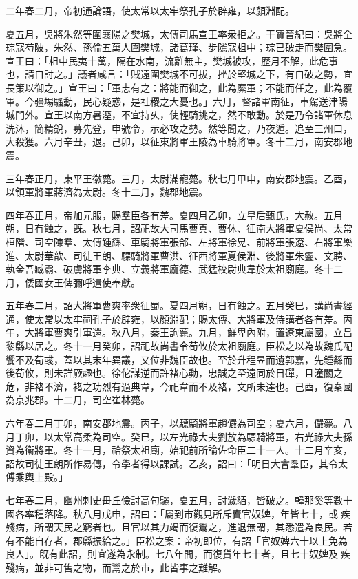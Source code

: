 \begin{pinyinscope}
二年春二月，帝初通論語，使太常以太牢祭孔子於辟雍，以顏淵配。

夏五月，吳將朱然等圍襄陽之樊城，太傅司馬宣王率衆拒之。干寶晉紀曰：吳將全琮寇芍陂，朱然、孫倫五萬人圍樊城，諸葛瑾、步隲寇柤中；琮已破走而樊圍急。宣王曰：「柤中民夷十萬，隔在水南，流離無主，樊城被攻，歷月不解，此危事也，請自討之。」議者咸言：「賊遠圍樊城不可拔，挫於堅城之下，有自破之勢，宜長策以御之。」宣王曰：「軍志有之：將能而御之，此為縻軍；不能而任之，此為覆軍。今疆埸騷動，民心疑惑，是社稷之大憂也。」六月，督諸軍南征，車駕送津陽城門外。宣王以南方暑溼，不宜持乆，使輕騎挑之，然不敢動。於是乃令諸軍休息洗沐，簡精銳，募先登，申號令，示必攻之勢。然等聞之，乃夜遁。追至三州口，大殺獲。六月辛丑，退。己卯，以征東將軍王陵為車騎將軍。冬十二月，南安郡地震。

三年春正月，東平王徽薨。三月，太尉滿寵薨。秋七月甲申，南安郡地震。乙酉，以領軍將軍蔣濟為太尉。冬十二月，魏郡地震。

四年春正月，帝加元服，賜羣臣各有差。夏四月乙卯，立皇后甄氏，大赦。五月朔，日有蝕之，旣。秋七月，詔祀故大司馬曹真、曹休、征南大將軍夏侯尚、太常桓階、司空陳羣、太傅鍾繇、車騎將軍張郃、左將軍徐晃、前將軍張遼、右將軍樂進、太尉華歆、司徒王朗、驃騎將軍曹洪、征西將軍夏侯淵、後將軍朱靈、文聘、執金吾臧霸、破虜將軍李典、立義將軍龐德、武猛校尉典韋於太祖廟庭。冬十二月，倭國女王俾彌呼遣使奉獻。

五年春二月，詔大將軍曹爽率衆征蜀。夏四月朔，日有蝕之。五月癸巳，講尚書經通，使太常以太牢祠孔子於辟雍，以顏淵配；賜太傳、大將軍及侍講者各有差。丙午，大將軍曹爽引軍還。秋八月，秦王詢薨。九月，鮮卑內附，置遼東屬國，立昌黎縣以居之。冬十一月癸卯，詔祀故尚書令荀攸於太祖廟庭。臣松之以為故魏氏配饗不及荀彧，蓋以其末年異議，又位非魏臣故也。至於升程昱而遺郭嘉，先鍾繇而後荀攸，則未詳厥趣也。徐佗謀逆而許褚心動，忠誠之至遠同於日磾，且潼關之危，非褚不濟，褚之功烈有過典韋，今祀韋而不及褚，文所未達也。己酉，復秦國為京兆郡。十二月，司空崔林薨。

六年春二月丁卯，南安郡地震。丙子，以驃騎將軍趙儼為司空；夏六月，儼薨。八月丁卯，以太常高柔為司空。癸巳，以左光祿大夫劉放為驃騎將軍，右光祿大夫孫資為衞將軍。冬十一月，祫祭太祖廟，始祀前所論佐命臣二十一人。十二月辛亥，詔故司徒王朗所作易傳，令學者得以課試。乙亥，詔曰：「明日大會羣臣，其令太傅乘輿上殿。」

七年春二月，幽州刺史毌丘儉討高句驪，夏五月，討濊貊，皆破之。韓那奚等數十國各率種落降。秋八月戊申，詔曰：「屬到巿觀見所斥賣官奴婢，年皆七十，或𤸇疾殘病，所謂天民之窮者也。且官以其力竭而復鬻之，進退無謂，其悉遣為良民。若有不能自存者，郡縣振給之。」臣松之案：帝初即位，有詔「官奴婢六十以上免為良人」。旣有此詔，則宜遂為永制。七八年間，而復貨年七十者，且七十奴婢及𤸇疾殘病，並非可售之物，而鬻之於巿，此皆事之難解。


\end{pinyinscope}
